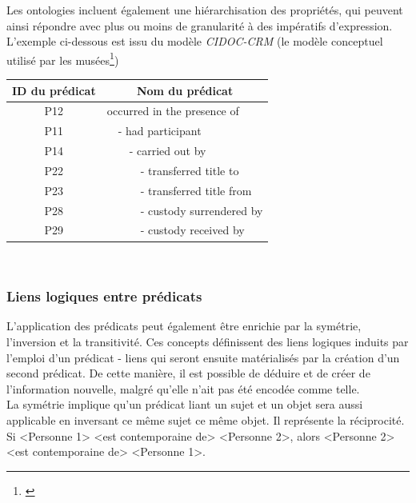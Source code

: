 \documentclass[a4paper,12pt,twoside]{book}
\begin{document}
Les ontologies incluent également une hiérarchisation des propriétés, qui peuvent ainsi répondre avec plus ou moins de granularité à des impératifs d'expression. L'exemple ci-dessous est issu du modèle \textit{CIDOC-CRM} (le modèle conceptuel utilisé par les musées\footnote{\cite{internationalcouncilofmuseumsClassesPropertiesDeclarations2022}})
\begin{center}    
\begin{tabular}{|c|llll|}
\hline
ID du prédicat & \multicolumn{4}{c|}{Nom du prédicat}\\
\hline
P12 & \multicolumn{4}{l|}{occurred in the presence of}\\
\hline
P11 & & \multicolumn{3}{l|}{- had participant}\\
\hline
P14 & & & \multicolumn{2}{l|}{- carried out by}\\
\hline
P22 & & & & \multicolumn{1}{l|}{- transferred title to}\\
\hline
P23 & & & & \multicolumn{1}{l|}{- transferred title from}\\
\hline
P28 & & & & \multicolumn{1}{l|}{- custody surrendered by}\\
\hline
P29 & & & & \multicolumn{1}{l|}{- custody received by}\\
\hline
\end{tabular}\
\end{center}

\subsubsection{Liens logiques entre prédicats}\label{liens-logiques}
L'application des prédicats peut également être enrichie par la symétrie, l'inversion et la transitivité. Ces concepts définissent des liens logiques induits par l'emploi d'un prédicat - liens qui seront ensuite matérialisés par la création d'un second prédicat. De cette manière, il est possible de déduire et de créer de l'information nouvelle, malgré qu'elle n'ait pas été encodée comme telle.\\

La symétrie implique qu'un prédicat liant un sujet et un objet sera aussi applicable en inversant ce même sujet ce même objet. Il représente la réciprocité. Si \textless Personne 1\textgreater{} \textless est contemporaine de\textgreater{} \textless Personne 2\textgreater, alors \textless Personne 2\textgreater{} \textless est contemporaine de\textgreater{} \textless Personne 1\textgreater.\\
\end{document}

